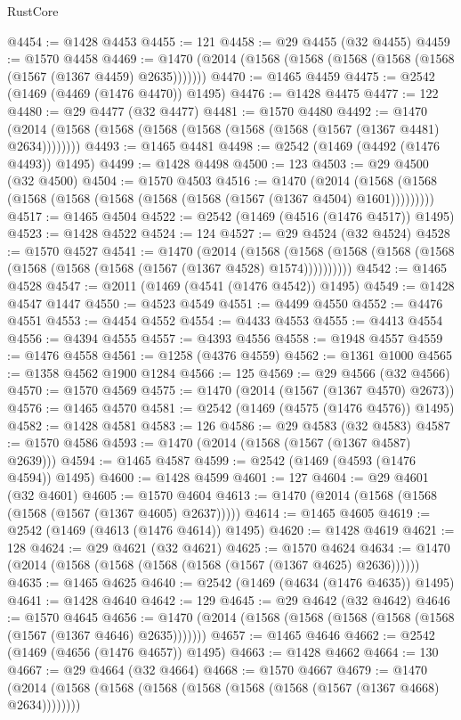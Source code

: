\begin{lexlean}{RustCore}
\begin{coremodule}
@4454 := @1428 @4453
@4455 := 121
@4458 := @29 @4455 (@32 @4455)
@4459 := @1570 @4458
@4469 := @1470 (@2014 (@1568 (@1568 (@1568 (@1568 (@1568 (@1567 (@1367 @4459) @2635)))))))
@4470 := @1465 @4459
@4475 := @2542 (@1469 (@4469 (@1476 @4470)) @1495)
@4476 := @1428 @4475
@4477 := 122
@4480 := @29 @4477 (@32 @4477)
@4481 := @1570 @4480
@4492 := @1470 (@2014 (@1568 (@1568 (@1568 (@1568 (@1568 (@1568 (@1567 (@1367 @4481) @2634))))))))
@4493 := @1465 @4481
@4498 := @2542 (@1469 (@4492 (@1476 @4493)) @1495)
@4499 := @1428 @4498
@4500 := 123
@4503 := @29 @4500 (@32 @4500)
@4504 := @1570 @4503
@4516 := @1470
    (@2014 (@1568 (@1568 (@1568 (@1568 (@1568 (@1568 (@1568 (@1567 (@1367 @4504) @1601)))))))))
@4517 := @1465 @4504
@4522 := @2542 (@1469 (@4516 (@1476 @4517)) @1495)
@4523 := @1428 @4522
@4524 := 124
@4527 := @29 @4524 (@32 @4524)
@4528 := @1570 @4527
@4541 := @1470
    (@2014
      (@1568 (@1568 (@1568 (@1568 (@1568 (@1568 (@1568 (@1568 (@1567 (@1367 @4528) @1574))))))))))
@4542 := @1465 @4528
@4547 := @2011 (@1469 (@4541 (@1476 @4542)) @1495)
@4549 := @1428 @4547 @1447
@4550 := @4523 @4549
@4551 := @4499 @4550
@4552 := @4476 @4551
@4553 := @4454 @4552
@4554 := @4433 @4553
@4555 := @4413 @4554
@4556 := @4394 @4555
@4557 := @4393 @4556
@4558 := @1948 @4557
@4559 := @1476 @4558
@4561 := @1258 (@4376 @4559)
@4562 := @1361 @1000
@4565 := @1358 @4562 @1900 @1284
@4566 := 125
@4569 := @29 @4566 (@32 @4566)
@4570 := @1570 @4569
@4575 := @1470 (@2014 (@1567 (@1367 @4570) @2673))
@4576 := @1465 @4570
@4581 := @2542 (@1469 (@4575 (@1476 @4576)) @1495)
@4582 := @1428 @4581
@4583 := 126
@4586 := @29 @4583 (@32 @4583)
@4587 := @1570 @4586
@4593 := @1470 (@2014 (@1568 (@1567 (@1367 @4587) @2639)))
@4594 := @1465 @4587
@4599 := @2542 (@1469 (@4593 (@1476 @4594)) @1495)
@4600 := @1428 @4599
@4601 := 127
@4604 := @29 @4601 (@32 @4601)
@4605 := @1570 @4604
@4613 := @1470 (@2014 (@1568 (@1568 (@1568 (@1567 (@1367 @4605) @2637)))))
@4614 := @1465 @4605
@4619 := @2542 (@1469 (@4613 (@1476 @4614)) @1495)
@4620 := @1428 @4619
@4621 := 128
@4624 := @29 @4621 (@32 @4621)
@4625 := @1570 @4624
@4634 := @1470 (@2014 (@1568 (@1568 (@1568 (@1568 (@1567 (@1367 @4625) @2636))))))
@4635 := @1465 @4625
@4640 := @2542 (@1469 (@4634 (@1476 @4635)) @1495)
@4641 := @1428 @4640
@4642 := 129
@4645 := @29 @4642 (@32 @4642)
@4646 := @1570 @4645
@4656 := @1470 (@2014 (@1568 (@1568 (@1568 (@1568 (@1568 (@1567 (@1367 @4646) @2635)))))))
@4657 := @1465 @4646
@4662 := @2542 (@1469 (@4656 (@1476 @4657)) @1495)
@4663 := @1428 @4662
@4664 := 130
@4667 := @29 @4664 (@32 @4664)
@4668 := @1570 @4667
@4679 := @1470 (@2014 (@1568 (@1568 (@1568 (@1568 (@1568 (@1568 (@1567 (@1367 @4668) @2634))))))))

\end{coremodule}
\end{lexlean}
